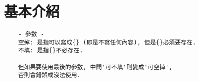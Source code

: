 \section{基本介紹}


  \begin{framed}
  \begin{verbatim}
    - 參數 -
    空掉: 是指可以寫成{} (即是不寫任何內容), 但是{}必須要存在.
    不填: 是指{}不必存在.

    但如果要使用最後的參數, 中間'可不填'則變成'可空掉',
    否則會錯誤或沒法使用.
  \end{verbatim}
  \end{framed}


\EndChapter
